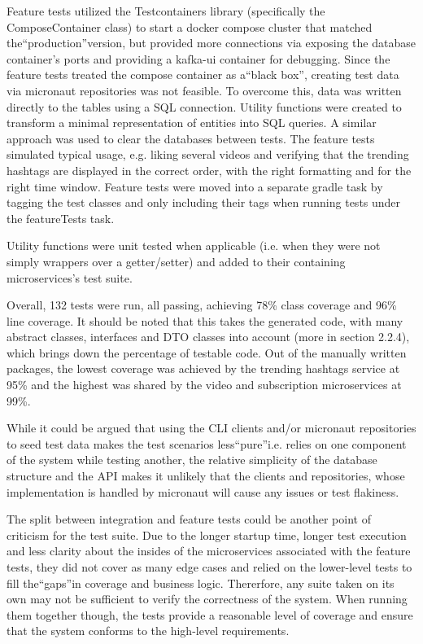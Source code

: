 \documentclass[parskip=full]{article}
\begin{document}
Feature tests utilized the Testcontainers library (specifically the ComposeContainer class) to start a docker compose cluster that matched the``production''version, but provided more connections via exposing the database container's ports and providing a kafka-ui container for debugging.
Since the feature tests treated the compose container as a``black box'', creating test data via micronaut repositories was not feasible.
To overcome this, data was written directly to the tables using a SQL connection.
Utility functions were created to transform a minimal representation of entities into SQL queries.
A similar approach was used to clear the databases between tests.
The feature tests simulated typical usage, e.g. liking several videos and verifying that the trending hashtags are displayed in the correct order, with the right formatting and for the right time window.
Feature tests were moved into a separate gradle task by tagging the test classes and only including their tags when running tests under the featureTests task.

Utility functions were unit tested when applicable (i.e. when they were not simply wrappers over a getter/setter) and added to their containing microservices's test suite.

Overall, 132 tests were run, all passing, achieving 78\% class coverage and 96\% line coverage.
It should be noted that this takes the generated code, with many abstract classes, interfaces and DTO classes into account (more in section 2.2.4), which brings down the percentage of testable code.
Out of the manually written packages, the lowest coverage was achieved by the trending hashtags service at 95\% and the highest was shared by the video and subscription microservices at 99\%.

While it could be argued that using the CLI clients and/or micronaut repositories to seed test data makes the test scenarios less``pure''i.e. relies on one component of the system while testing another, the relative simplicity of the database structure and the API makes it unlikely that the clients and repositories, whose implementation is handled by micronaut will cause any issues or test flakiness.

The split between integration and feature tests could be another point of criticism for the test suite.
Due to the longer startup time, longer test execution and less clarity about the insides of the microservices associated with the feature tests, they did not cover as many edge cases and relied on the lower-level tests to fill the``gaps''in coverage and business logic.
Thererfore, any suite taken on its own may not be sufficient to verify the correctness of the system.
When running them together though, the tests provide a reasonable level of coverage and ensure that the system conforms to the high-level requirements.
\end{document}
